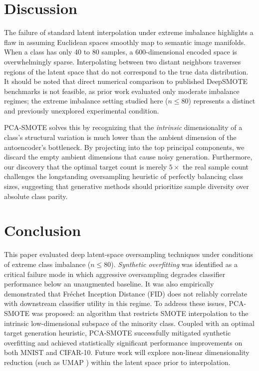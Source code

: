 \documentclass[conference]{IEEEtran}
\begin{document}
\section{Discussion}
\label{sec:discussion}
The failure of standard latent interpolation under extreme imbalance highlights a flaw in assuming Euclidean spaces smoothly map to semantic image manifolds. When a class has only 40 to 80 samples, a 600-dimensional encoded space is overwhelmingly sparse. Interpolating between two distant neighbors traverses regions of the latent space that do not correspond to the true data distribution. It should be noted that direct numerical comparison to published DeepSMOTE benchmarks is not feasible, as prior work evaluated only moderate imbalance regimes; the extreme imbalance setting studied here ($n \leq 80$) represents a distinct and previously unexplored experimental condition.

PCA-SMOTE solves this by recognizing that the \emph{intrinsic} dimensionality of a class's structural variation is much lower than the ambient dimension of the autoencoder's bottleneck. By projecting into the top principal components, we discard the empty ambient dimensions that cause noisy generation. Furthermore, our discovery that the optimal target count is merely $5\times$ the real sample count challenges the longstanding oversampling heuristic of perfectly balancing class sizes, suggesting that generative methods should prioritize sample diversity over absolute class parity.

\section{Conclusion}
\label{sec:conclusion}
This paper evaluated deep latent-space oversampling techniques under conditions of extreme class imbalance ($n \le 80$). \emph{Synthetic overfitting} was identified as a critical failure mode in which aggressive oversampling degrades classifier performance below an unaugmented baseline. It was also empirically demonstrated that Fr\'{e}chet Inception Distance (FID) does not reliably correlate with downstream classifier utility in this regime. To address these issues, PCA-SMOTE was proposed: an algorithm that restricts SMOTE interpolation to the intrinsic low-dimensional subspace of the minority class. Coupled with an optimal target generation heuristic, PCA-SMOTE successfully mitigated synthetic overfitting and achieved statistically significant performance improvements on both MNIST and CIFAR-10. Future work will explore non-linear dimensionality reduction (such as UMAP \cite{mcinnes2018umap}) within the latent space prior to interpolation.




\end{document}
